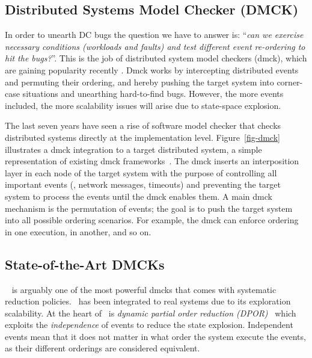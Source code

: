\subsection{Distributed Systems Model Checker (DMCK)}

In order to unearth DC bugs the question we have to answer is: ``{\em can we
exercise necessary conditions (\ie workloads and faults) and test different
event re-ordering to hit the bugs?}''. This is the job of distributed system
model checkers (dmck), which are gaining popularity recently
\cite{Guo+11-Demeter, Killian+07-LifeDeathMaceMC, Simsa+10-Dbug,
Yang+09-Modist}. Dmck works by intercepting distributed events and permuting
their ordering, and hereby pushing the target system into corner-case situations
and unearthing hard-to-find bugs. However, the more events included, the more
scalability issues will arise due to state-space explosion.



The last seven years have seen a rise of software model checker that checks
distributed systems directly at the implementation level.  Figure~\ref{fig-dmck}
illustrates a dmck integration to a target distributed system, a simple
representation of existing dmck frameworks~\cite{Guo+11-Demeter,
Killian+07-LifeDeathMaceMC, Simsa+10-Dbug, Yang+09-Modist}.  The dmck inserts an
interposition layer in each node of the target system with the purpose of
controlling all important events (\eg, network messages, timeouts) and
preventing the target system to process the events until the dmck enables them.
A main dmck mechanism is the permutation of events; the goal is to push the
target system into all possible ordering scenarios.  For example, the dmck can
enforce  ordering in one execution,  in another, and so on.

\subsection{State-of-the-Art DMCKs}

\modist~\cite{Yang+09-Modist} is arguably one of the most powerful
dmcks that comes with systematic reduction policies.  \modist\ has been
integrated to real systems due to its exploration
scalability.  At the heart of \modist\ is {\em dynamic partial order
  reduction (DPOR)}~\cite{Flanagan+05-Dpor} which exploits the {\em
  independence} of events to reduce the state explosion.  Independent
events mean that it does not matter in what order the system execute
the events, as their different orderings are considered equivalent.

